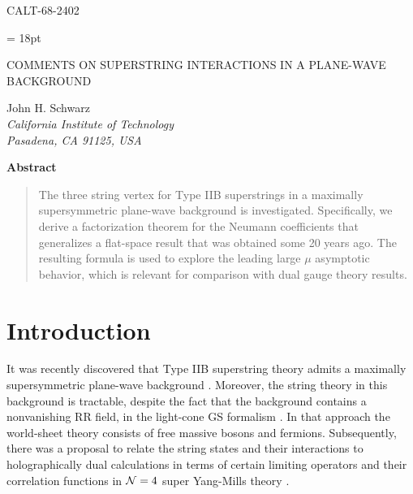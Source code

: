 \documentclass[a4paper,12pt]{article}
\begin{document}
\vspace*{-.6in}
\thispagestyle{empty}
\begin{flushright}
CALT-68-2402
\end{flushright}
\baselineskip = 18pt

\vspace{1.5in} {\Large
\begin{center}
COMMENTS ON SUPERSTRING INTERACTIONS IN A PLANE-WAVE
BACKGROUND\end{center}} \vspace{.5in}

\begin{center}
John H. Schwarz
\\
\emph{California Institute of Technology\\ Pasadena, CA  91125, USA}
\end{center}
\vspace{1in}

\begin{center}
\textbf{Abstract}
\end{center}
\begin{quotation}
\noindent The three string vertex for Type IIB superstrings in a
maximally supersymmetric plane-wave background is investigated.
Specifically, we derive a factorization theorem for the Neumann
coefficients that generalizes a flat-space result that was
obtained some 20 years ago. The resulting formula is used to
explore the leading large $\mu$ asymptotic behavior, which is
relevant for comparison with dual gauge theory results.
\end{quotation}

\newpage


\section{Introduction}

It was recently discovered that Type IIB superstring theory admits
a maximally supersymmetric plane-wave background
\cite{Blau:2001ne}. Moreover, the string theory in this background
is tractable, despite the fact that the background contains a
nonvanishing RR field, in the light-cone GS formalism
\cite{Metsaev:2001bj}. In that approach the world-sheet theory
consists of free massive bosons and fermions. Subsequently, there
was a proposal to relate the string states and their interactions
to holographically dual calculations in terms of certain limiting
operators and their correlation functions in ${\cal N} = 4$ super
Yang-Mills theory \cite{Berenstein:2002jq}.
\end{document}
